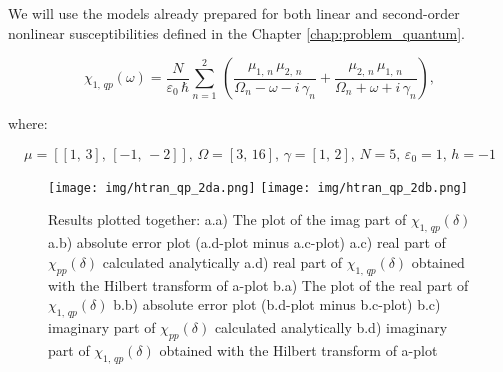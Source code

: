 \documentclass[12pt,twoside,a4paper]{article}
\numberwithin{equation}{subsection}
\numberwithin{figure}{subsection}
\begin{document}
We will use the models already prepared for both linear and second-order nonlinear susceptibilities defined
in the Chapter \ref{chap:problem_quantum}.

\begin{equation} \label{eq:htran_qpeq}
  \chi_{1, \,qp}(\omega ) = 
  \frac{N}{\varepsilon_0\,\hbar} \sum_{n=1}^{2}\,(\frac {{\mu_{1, \,n}}\,{\mu_{2, \,n}}}{{\Omega_{n}} - \omega -
  i\,{\gamma_{n}}} + \frac {{\mu_{2, \,n}}\,{\mu_{1, \,n}}}{{\Omega_{n}} + \omega + i\,{\gamma_{n}}}),
\end{equation}

where:

\begin{equation*}
  \mu = [[1, \,3], \,[ -1, \, -2]],\,\Omega =[3, \,16],\,\gamma =[1, \,2],\,N=5,\,\varepsilon_{0}=1, \,h= - 1
\end{equation*}



\begin{figure} 
  \texttt{[image: img/htran\_qp\_2da.png]} 
  \texttt{[image: img/htran\_qp\_2db.png]}  
  \caption{Results plotted together:
  a.a) The plot of the imag part of ${\chi_{1, \,qp}}(\delta )$ 
  a.b) absolute error plot (a.d-plot minus a.c-plot) 
  a.c) real part of ${\chi_{pp}}(\delta )$ calculated analytically
  a.d) real part of ${\chi_{1, \,qp}}(\delta )$ obtained with the Hilbert transform of a-plot
  b.a) The plot of the real part of ${\chi_{1, \,qp}}(\delta )$
  b.b) absolute error plot (b.d-plot minus b.c-plot)  
  b.c) imaginary part of ${\chi_{pp}}(\delta )$ calculated analytically 
  b.d) imaginary part of ${\chi_{1, \,qp}}(\delta )$ obtained with the Hilbert transform of a-plot 
  \label{htran_qp_2d}}
\end{figure}
\end{document}
